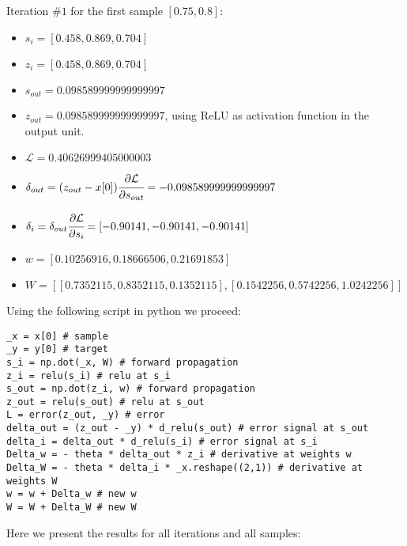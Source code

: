 \documentclass[10pt]{article}
\begin{document}
Iteration $\# 1$ for the first sample $[0.75, 0.8]$:\\
\begin{itemize}
\item $s_i = [ 0.458,  0.869,  0.704]$
\item $z_i = [ 0.458,  0.869,  0.704]$
\item $s_{out} = 0.098589999999999997$
\item $z_{out} = 0.098589999999999997$, using ReLU as activation function in the
output unit.
\item $\mathcal{L} = 0.40626999405000003$
\item $\delta_{out} = (z_{out} - x[0]) \cfrac{\partial \mathcal{L}}{\partial s_{out}} = -0.098589999999999997$
\item $\delta_{i} =  \delta_{out} \cfrac{\partial \mathcal{L}}{\partial s_{i}} = [-0.90141, -0.90141, -0.90141]$
\item $w = [ 0.10256916,  0.18666506,  0.21691853]$
\item $W = [[ 0.7352115,  0.8352115,  0.1352115],
        [ 0.1542256,  0.5742256,  1.0242256]]$
\end{itemize}
Using the following script in python we proceed:
\begin{verbatim}
_x = x[0] # sample
_y = y[0] # target
s_i = np.dot(_x, W) # forward propagation
z_i = relu(s_i) # relu at s_i
s_out = np.dot(z_i, w) # forward propagation
z_out = relu(s_out) # relu at s_out
L = error(z_out, _y) # error
delta_out = (z_out - _y) * d_relu(s_out) # error signal at s_out
delta_i = delta_out * d_relu(s_i) # error signal at s_i
Delta_w = - theta * delta_out * z_i # derivative at weights w
Delta_W = - theta * delta_i * _x.reshape((2,1)) # derivative at weights W
w = w + Delta_w # new w
W = W + Delta_W # new W
\end{verbatim}
Here we present the results for all iterations and all samples:
\end{document}
